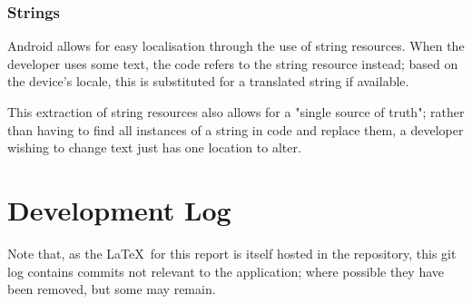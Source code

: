 \documentclass[11pt, a4paper, notitlepage]{report}
\begin{document}
\subsection{Strings}
Android allows for easy localisation through the use of string resources. When the developer uses some text, the code refers to the string resource instead; based on the device's locale, this is substituted for a translated string if available.

This extraction of string resources also allows for a "single source of truth"; rather than having to find all instances of a string in code and replace them, a developer wishing to change text just has one location to alter.

\appendix
\chapter{Development Log}\label{app:GitLog}
Note that, as the \LaTeX\ for this report is itself hosted in the repository, this git log contains commits not relevant to the application; where possible they have been removed, but some may remain.


\end{document}
